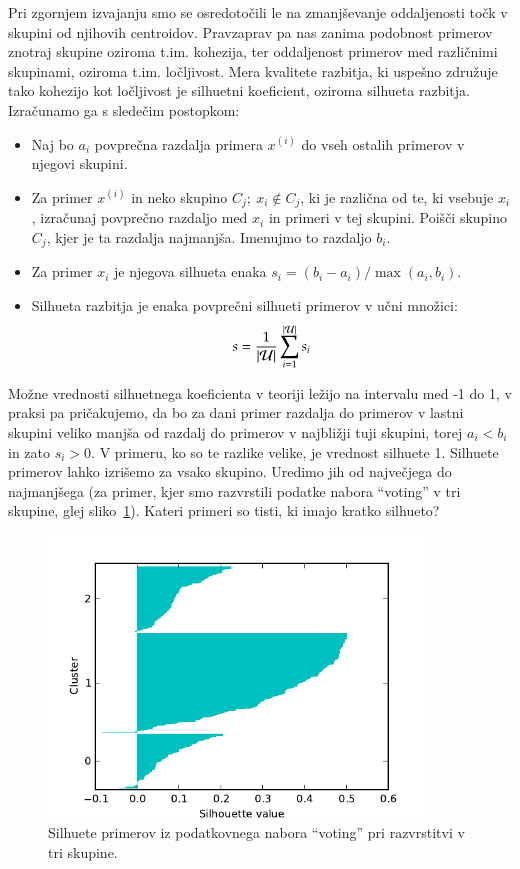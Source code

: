 Pri zgornjem izvajanju smo se osredotočili le na zmanjševanje
oddaljenosti točk v skupini od njihovih centroidov. Pravzaprav pa nas
zanima podobnost primerov znotraj skupine oziroma t.im. kohezija, ter
oddaljenost primerov med različnimi skupinami, oziroma
t.im. ločljivost. Mera kvalitete razbitja, ki uspešno združuje tako
kohezijo kot ločljivost je silhuetni koeficient, oziroma silhueta
razbitja. Izračunamo ga s sledečim postopkom:
\begin{itemize}
\item Naj bo $a_i$ povprečna razdalja primera $x^{(i)}$ do vseh ostalih primerov v njegovi skupini.
\item Za primer $x^{(i)}$ in neko skupino $C_j;\ x_i\not\in C_j$, ki   je različna od te, ki vsebuje $x_i$, izračunaj povprečno razdaljo   med $x_i$ in primeri v tej skupini. Poišči skupino $C_j$, kjer je ta   razdalja najmanjša. Imenujmo to razdaljo $b_i$.
\item Za primer $x_i$ je njegova silhueta enaka
  $s_i=(b_i-a_i)/\max(a_i,b_i)$.
\item Silhueta razbitja je enaka povprečni silhueti primerov v učni
  množici:
$$s={1 \over |\mathcal{U}|}\sum_{i=1}^{|\mathcal{U}|} s_i$$
\end{itemize}

Možne vrednosti silhuetnega koeficienta v teoriji ležijo na intervalu
med -1 do 1, v praksi pa pričakujemo, da bo za dani primer razdalja do
primerov v lastni skupini veliko manjša od razdalj do primerov v
najbližji tuji skupini, torej $a_i<b_i$ in zato $s_i>0$. V primeru, ko
so te razlike velike, je vrednost silhuete 1. Silhuete primerov lahko
izrišemo za vsako skupino. Uredimo jih od največjega do najmanjšega
(za primer, kjer smo razvrstili podatke nabora ``voting'' v tri
skupine, glej sliko~\ref{f-kmeans-silhouette-voting}). Kateri primeri so tisti, ki imajo kratko silhueto?

\begin{figure}[htbp]
\begin{center}
\includegraphics[width=10cm]{slike/kmeans-silhouette-voting.pdf}
\caption{Silhuete primerov iz podatkovnega nabora ``voting'' pri
  razvrstitvi v tri skupine.}
\label{f-kmeans-silhouette-voting}
\end{center}
\end{figure}

